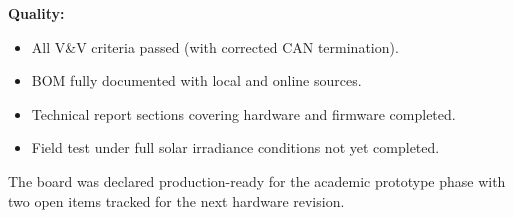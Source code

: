 \textbf{Quality:}
\begin{itemize}
    \item[$\checkmark$] All V\&V criteria passed (with corrected CAN termination).
    \item[$\checkmark$] BOM fully documented with local and online sources.
    \item[$\checkmark$] Technical report sections covering hardware and firmware completed.
    \item[$\times$] Field test under full solar irradiance conditions not yet completed.
\end{itemize}

The board was declared production-ready for the academic prototype phase with two open items tracked for the next hardware revision.
